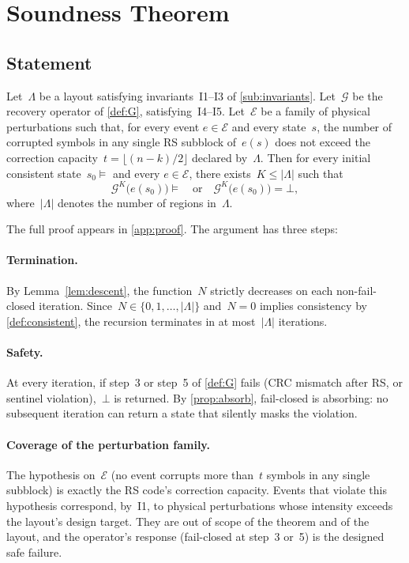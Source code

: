 \section{Soundness Theorem}\label{sec:soundness}

\subsection{Statement}

\begin{theorem}\label{thm:soundness}
Let~\(\Lambda\) be a layout satisfying invariants~\textup{I1--I3} of
\cref{sub:invariants}. Let~\(\mathcal{G}\) be the recovery operator
of \cref{def:G}, satisfying~\textup{I4--I5}. Let~\(\mathcal{E}\) be a
family of physical perturbations such that, for every event
\(e \in \mathcal{E}\) and every state~\(s\), the number of corrupted
symbols in any single RS subblock of~\(e(s)\) does not exceed the
correction capacity~\(t = \lfloor (n-k)/2 \rfloor\) declared by~\(\Lambda\).
Then for every initial consistent state~\(s_0 \models\) and every
\(e \in \mathcal{E}\), there exists~\(K \le |\Lambda|\) such that
\[
  \mathcal{G}^{K}\bigl(e(s_0)\bigr) \models
  \quad\text{or}\quad
  \mathcal{G}^{K}\bigl(e(s_0)\bigr) = \bot,
\]
where~\(|\Lambda|\) denotes the number of regions in~\(\Lambda\).
\end{theorem}

The full proof appears in \cref{app:proof}. The argument has
three steps:

\paragraph{Termination.}
By Lemma~\ref{lem:descent}, the function~\(N\) strictly decreases on
each non-fail-closed iteration. Since~\(N \in \{0, 1, \dots, |\Lambda|\}\)
and~\(N = 0\) implies consistency by \cref{def:consistent},
the recursion terminates in at most~\(|\Lambda|\) iterations.

\paragraph{Safety.}
At every iteration, if step~3 or step~5 of \cref{def:G}
fails (CRC mismatch after RS, or sentinel violation),~\(\bot\) is
returned. By \cref{prop:absorb}, fail-closed is absorbing:
no subsequent iteration can return a state that silently masks the
violation.

\paragraph{Coverage of the perturbation family.}
The hypothesis on~\(\mathcal{E}\) (no event corrupts more than~\(t\)
symbols in any single subblock) is exactly the RS code's correction
capacity. Events that violate this hypothesis correspond, by~I1, to
physical perturbations whose intensity exceeds the layout's design
target. They are out of scope of the theorem and of the layout, and
the operator's response (fail-closed at step~3 or~5) is the
designed safe failure.

